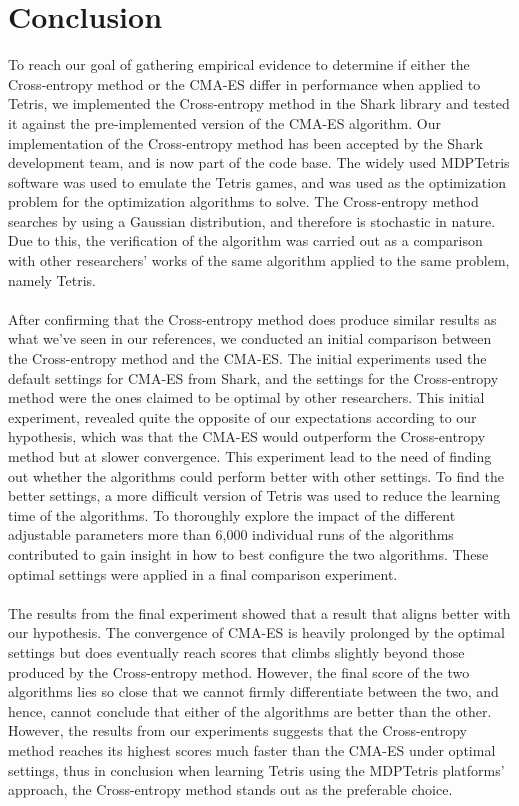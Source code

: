 \section{Conclusion}

To reach our goal of gathering empirical evidence to determine if either the Cross-entropy method
or the CMA-ES differ in performance when applied to Tetris, we implemented the Cross-entropy method in the Shark library and tested it against the pre-implemented version of the CMA-ES
algorithm. Our implementation of the Cross-entropy 
method has been accepted by the Shark development team, and is now part of the code base.
The widely used MDPTetris software was used to emulate the
Tetris games, and was used as the optimization problem for the optimization algorithms to solve.
The Cross-entropy method searches by using a Gaussian 
distribution, and therefore is stochastic in nature. Due to this, 
the verification of the algorithm was carried out as a comparison with other 
researchers' works of the same algorithm applied to the same problem, namely Tetris.\\
\\
After confirming that the Cross-entropy method does produce similar results as 
what we've seen in our references, we conducted an initial comparison between the
Cross-entropy method and the CMA-ES. The initial experiments used the default settings for CMA-ES
from Shark,
and the settings for the Cross-entropy method were the ones claimed to be optimal by other 
researchers. This initial experiment, revealed quite the opposite of our expectations 
according to our hypothesis, which was that the CMA-ES would outperform the Cross-entropy method
but at slower convergence. This experiment lead to the need of finding out whether the algorithms
could perform better with other settings. To find the better settings, a more difficult version
of Tetris was used to reduce the learning time of the algorithms. To thoroughly explore 
the impact of the different adjustable parameters more than 6,000 individual runs of the 
algorithms contributed to gain insight in how to best configure the two algorithms. These 
optimal settings were applied in a final comparison experiment.\\
\\
The results from the final experiment showed that a result that aligns better with our
hypothesis. The convergence of CMA-ES is heavily prolonged by the optimal settings
but does eventually reach scores that climbs slightly beyond those produced by the
Cross-entropy method. However, the final score of the two algorithms lies so close that
we cannot firmly differentiate between the two, and hence, cannot conclude that either of the
algorithms are better than the other. However, the results from our experiments 
suggests that the Cross-entropy method reaches its 
highest scores much faster than the CMA-ES under optimal settings, thus in conclusion
when learning Tetris using the MDPTetris platforms' approach, the Cross-entropy method 
stands out as the preferable choice.


